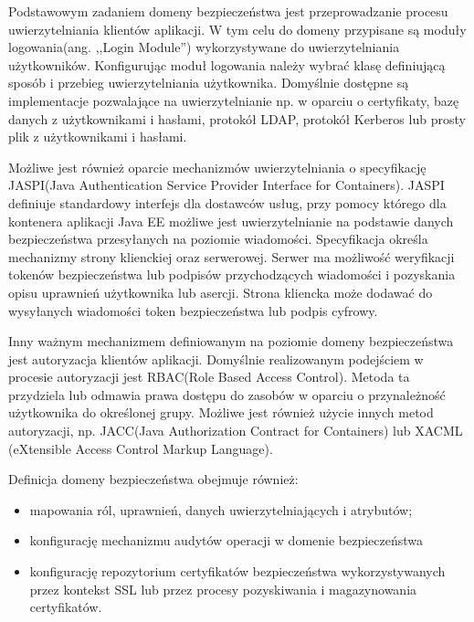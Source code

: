 		Podstawowym zadaniem domeny bezpieczeństwa jest przeprowadzanie procesu uwierzytelniania klientów aplikacji. W tym celu do domeny przypisane są moduły logowania(ang. ,,Login Module'') wykorzystywane do uwierzytelniania użytkowników. Konfigurując moduł logowania należy wybrać klasę definiującą sposób i przebieg uwierzytelniania użytkownika. Domyślnie dostępne są implementacje pozwalające na uwierzytelnianie np. w oparciu o certyfikaty, bazę danych z użytkownikami i hasłami, protokół LDAP, protokół Kerberos lub prosty plik z użytkownikami i hasłami.

		Możliwe jest również oparcie mechanizmów uwierzytelniania o specyfikację JASPI(Java Authentication Service Provider Interface for Containers). JASPI definiuje standardowy interfejs dla dostawców usług, przy pomocy którego dla kontenera aplikacji Java EE możliwe jest uwierzytelnianie na podstawie danych bezpieczeństwa przesyłanych na poziomie wiadomości. Specyfikacja określa mechanizmy strony klienckiej oraz serwerowej. Serwer ma możliwość weryfikacji tokenów bezpieczeństwa lub podpisów przychodzących wiadomości i pozyskania opisu uprawnień użytkownika lub asercji. Strona kliencka może dodawać do wysyłanych wiadomości token bezpieczeństwa lub podpis cyfrowy. 

		Inny ważnym mechanizmem definiowanym na poziomie domeny bezpieczeństwa jest autoryzacja klientów aplikacji. Domyślnie realizowanym podejściem w procesie autoryzacji jest RBAC(Role Based Access Control). Metoda ta przydziela lub odmawia prawa dostępu do zasobów w oparciu o przynależność użytkownika do określonej grupy. Możliwe jest również użycie innych metod autoryzacji, np. JACC(Java Authorization Contract for Containers) lub XACML (eXtensible Access Control Markup Language). 

		Definicja domeny bezpieczeństwa obejmuje również:

		\begin{itemize}
			\item mapowania ról, uprawnień, danych uwierzytelniających i atrybutów; 
			\item konfigurację mechanizmu audytów operacji w domenie bezpieczeństwa
			\item konfigurację repozytorium certyfikatów bezpieczeństwa wykorzystywanych przez kontekst SSL lub przez procesy pozyskiwania i magazynowania certyfikatów.
		\end{itemize}
		

